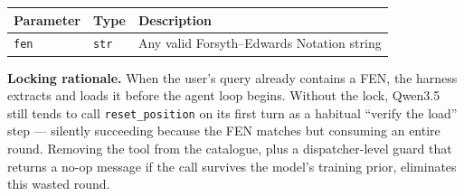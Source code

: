\begin{tcolorbox}[toolbox, title={\texttt{reset\_position(fen: str)} \textnormal{--- locked when FEN auto-loaded}}]

\smallskip
\begin{tabular}{@{}lp{1.5cm}p{8.5cm}@{}}
  \toprule
  \textbf{Parameter} & \textbf{Type} & \textbf{Description} \\
  \midrule
  \texttt{fen} & \texttt{str} & Any valid Forsyth--Edwards Notation string \\
  \bottomrule
\end{tabular}

\smallskip
{}

\smallskip
\noindent \textbf{Locking rationale.}  When the user's query already contains
a FEN, the harness extracts and loads it before the agent loop begins.
Without the lock, Qwen3.5 still tends to call \texttt{reset\_position}
on its first turn as a habitual ``verify the load'' step --- silently
succeeding because the FEN matches but consuming an entire round.
Removing the tool from the catalogue, plus a dispatcher-level guard
that returns a no-op message if the call survives the model's training
prior, eliminates this wasted round.
\end{tcolorbox}

